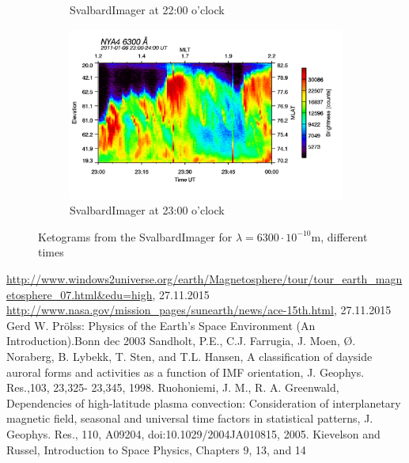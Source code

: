 \documentclass[10pt,a4paper]{article}
\begin{document}
\begin{figure}[h]
\begin{subfigure}{0.3\textwidth}
	\caption{ SvalbardImager at 22:00 o'clock \label{SBI_6_22}}
\end{subfigure}
\begin{subfigure}{0.3\textwidth}
\centering
	\includegraphics[width=\textwidth]{SvalbardImager6300A23.png}
	\caption{ SvalbardImager at 23:00 o'clock \label{SBI_6_23}}
\end{subfigure}
\caption{Ketograms from the SvalbardImager for $\lambda=6300 \cdot 10^{-10} \mathrm{m}$, different times }
\label{SBI_6_timedevelop}
\end{figure}
\newpage


\begin{thebibliography}{mustermarke}
 \url{http://www.windows2universe.org/earth/Magnetosphere/tour/tour_earth_magnetosphere_07.html&edu=high}, 27.11.2015
 \url{http://www.nasa.gov/mission_pages/sunearth/news/ace-15th.html}, 27.11.2015
 Gerd W. Prölss: Physics of the Earth's Space Environment (An Introduction).Bonn  dec 2003 
 Sandholt, P.E., C.J. Farrugia, J. Moen, Ø. Noraberg, B. Lybekk, T. Sten, and T.L. Hansen, A classification
of dayside auroral forms and activities as a function of IMF orientation, J. Geophys. Res.,103, 23,325-
23,345, 1998.
 Ruohoniemi, J. M., R. A. Greenwald, Dependencies of high-latitude plasma convection: Consideration
of interplanetary magnetic field, seasonal and universal time factors in statistical patterns, J. Geophys.
Res., 110, A09204, doi:10.1029/2004JA010815, 2005.
 Kievelson and Russel, Introduction to Space Physics, Chapters 9, 13, and 14
\end{thebibliography}
\end{document}
